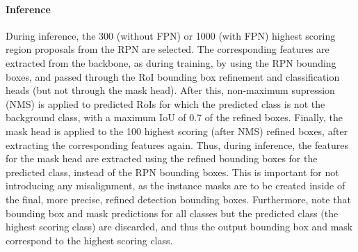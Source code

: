 \paragraph{Inference}
During inference, the 300 (without FPN) or 1000 (with FPN) highest scoring region proposals
from the RPN are selected. The corresponding features are extracted from the backbone, as during training, by using the RPN bounding boxes,
and passed through the RoI bounding box refinement and classification heads
(but not through the mask head).
After this, non-maximum supression (NMS) is applied to predicted RoIs for which the predicted class is not the background class,
with a maximum IoU of 0.7 of the refined boxes.
Finally, the mask head is applied to the 100 highest scoring (after NMS) refined boxes,
after extracting the corresponding features again.
Thus, during inference, the features for the mask head are extracted using the refined
bounding boxes for the predicted class, instead of the RPN bounding boxes. This is important for not
introducing any misalignment, as the instance masks are to be created inside of the
final, more precise, refined detection bounding boxes.
Furthermore, note that bounding box and mask predictions for all classes but the predicted
class (the highest scoring class) are discarded, and thus the output bounding
box and mask correspond to the highest scoring class.
